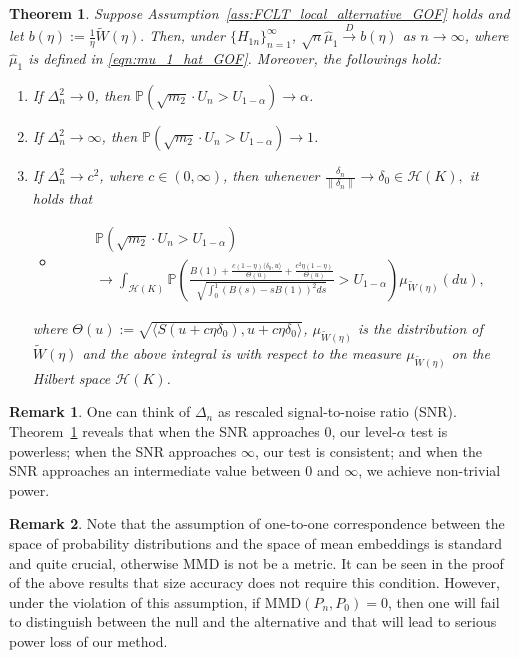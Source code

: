 \documentclass[11pt]{article}
\theoremstyle{plain}
\newtheorem{theorem}{Theorem}[section]
\theoremstyle{definition}
\newtheorem{remark}{Remark}
\theoremstyle{remark}
\begin{document}
\begin{theorem}\label{thm:GOF_asymptotic_power}
  Suppose Assumption~\ref{ass:FCLT_local_alternative_GOF} holds and let $b(\eta):=\frac{1}{\eta} \tilde{W}(\eta).$ Then, under $\{H_{1n}\}_{n=1}^{\infty}$, \(\sqrt{n}\hat{\mu}_1\overset{D}{\to}b(\eta)\) as $n \to \infty$, where $\hat{\mu}_1$ is defined in \eqref{eqn:mu_1_hat_GOF}. Moreover, the followings hold:
    \begin{enumerate}
        \item If $\Delta_n^2\to 0$, then $\mathbb{P}(\sqrt{m_2}\cdot U_n>U_{1-\alpha}) \to \alpha$.
        \item If $\Delta_n^2 \to \infty$, then $\mathbb{P}(\sqrt{m_2}\cdot U_n>U_{1-\alpha}) \to 1$. 
        \item If $\Delta_n^2 \to c^2$, where $c \in (0,\infty)$, then whenever $\frac{\delta_n}{\left\|\delta_n\right\|}\to \delta_0 \in \mathcal{H}(K),$ it holds that 
        \begin{itemize}
            \item [] 
            \begin{align*}
          &\mathbb{P}(\sqrt{m_2}\cdot U_n>U_{1-\alpha})\\
          &\to \int_{\mathcal{H}(K)} \mathbb{P}\left(\frac{B(1)+\frac{c (1-\eta) \langle \delta_0, u \rangle}{\Theta(u)}+\frac{c^2 \eta (1-\eta)}{\Theta(u)}}{\sqrt{\int_{0}^{1}\left(B(s)-sB(1)\right)^2 ds}}>U_{1-\alpha}\right)\mu_{\tilde{W}(\eta)}(du),
        \end{align*}
        \end{itemize}
        where $\Theta(u):=\sqrt{\langle S(u+c \eta \delta_0), u+c \eta \delta_0\rangle}$, $\mu_{\tilde{W}(\eta)}$ is the distribution of $\tilde{W}(\eta)$ and the above integral is with respect to the measure $\mu_{\tilde{W}(\eta)}$ on the Hilbert space $\mathcal{H}(K)$.
    \end{enumerate}
\end{theorem}
\begin{remark}
    One can think of $\Delta_n$ as rescaled signal-to-noise ratio (SNR). Theorem~\ref{thm:GOF_asymptotic_power} reveals that when the SNR approaches $0$, our level-$\alpha$ test is powerless; when the SNR approaches $\infty$, our test is consistent; and when the SNR approaches an intermediate value between $0$ and $\infty$, we achieve non-trivial power.
\end{remark}
\begin{remark}
    Note that the assumption of one-to-one correspondence between the space of probability distributions and the space of mean embeddings is standard and quite crucial, otherwise MMD is not be a metric. It can be seen in the proof of the above results that size accuracy does not require this condition. However, under the violation of this assumption, if MMD$(P_n,P_0)=0$, then one will fail to distinguish between the null and the alternative and that will lead to serious power loss of our method. 
\end{remark}
\end{document}
